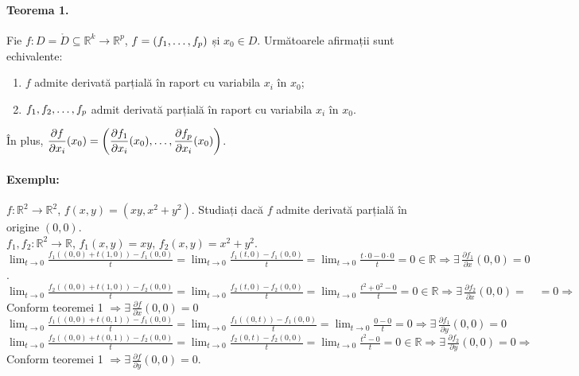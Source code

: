 \paragraph{Teorema 1.}
Fie $f:D = \mathring{D} \subseteq \mathbb{R}^{k} \rightarrow \mathbb{R}^{p}$, $f = (f_{1}, \mathellipsis, f_{p})$ și
$x_{0} \in D$. Următoarele afirmații sunt echivalente:
\begin{enumerate}[label=\emph{\alph*})]
    \item $f$ admite derivată parțială în raport cu variabila $x_{i}$ în $x_{0}$;
    \item $f_{1}, f_{2}, \mathellipsis, f_{p}$ admit derivată parțială în raport cu variabila $x_{i}$ în $x_{0}$.
\end{enumerate}
În plus, $\displaystyle\frac{\partial f}{\partial x_{i}}(x_{0}) = 
\left( \displaystyle\frac{\partial f_{1}}{\partial x_{i}}(x_{0}), \mathellipsis, \displaystyle\frac{\partial f_{p}}{\partial x_{i}}(x_{0}) \right)$.

\paragraph{Exemplu:}
$f:\mathbb{R}^{2} \rightarrow \mathbb{R}^{2}$, $f(x, y) = (xy, x^{2}+y^{2})$. Studiați dacă $f$ admite derivată parțială în origine $(0,0)$. \\[9pt]
$f_{1}, f_{2}: \mathbb{R}^{2} \rightarrow \mathbb{R}$, $f_{1}(x,y) = xy$, $f_{2}(x, y) = x^{2} + y^{2}$. \\[9pt]
$\displaystyle\lim_{t \rightarrow 0} \displaystyle\frac{f_{1}((0,0) + t(1,0)) - f_{1}(0,0)}{t} =
\displaystyle\lim_{t \rightarrow 0} \displaystyle\frac{f_{1}(t,0) - f_{1}(0,0)}{t} = 
\displaystyle\lim_{t \rightarrow 0} \displaystyle\frac{t \cdot 0 - 0 \cdot 0}{t} = 0 \in \mathbb{R}
\Rightarrow \exists \, \displaystyle\frac{\partial f_{1}}{\partial x}(0,0) = 0$. \\[7pt]
$\displaystyle\lim_{t \rightarrow 0} \displaystyle\frac{f_{2}((0,0) + t(1,0)) - f_{2}(0,0)}{t} =
\displaystyle\lim_{t \rightarrow 0} \displaystyle\frac{f_{2}(t,0) - f_{2}(0,0)}{t} = 
\displaystyle\lim_{t \rightarrow 0} \displaystyle\frac{t^{2} + 0^{2} - 0}{t} = 0 \in \mathbb{R}
\Rightarrow \exists \, \displaystyle\frac{\partial f_{2}}{\partial x}(0,0) = \quad =0 \Rightarrow$
Conform teoremei 1 $\Rightarrow \exists \, \displaystyle\frac{\partial f}{\partial x}(0,0) = 0$ \\[14pt]
$\displaystyle\lim_{t \rightarrow 0} \displaystyle\frac{f_{1}((0,0) + t(0,1)) - f_{1}(0,0)}{t} =
\displaystyle\lim_{t \rightarrow 0} \displaystyle\frac{f_{1}((0,t)) - f_{1}(0,0)}{t} =
\displaystyle\lim_{t \rightarrow 0} \displaystyle\frac{0 - 0}{t} = 0
\Rightarrow \exists \, \displaystyle\frac{\partial f_{1}}{\partial y}(0,0) = 0$ \\[7pt]
$\displaystyle\lim_{t \rightarrow 0} \displaystyle\frac{f_{2}((0,0) + t(0,1)) - f_{2}(0,0)}{t} =
\displaystyle\lim_{t \rightarrow 0} \displaystyle\frac{f_{2}(0,t) - f_{2}(0,0)}{t} = 
\displaystyle\lim_{t \rightarrow 0} \displaystyle\frac{t^{2} - 0}{t} = 0 \in \mathbb{R}
\Rightarrow \exists \, \displaystyle\frac{\partial f_{2}}{\partial y}(0,0) = 0 \Rightarrow$
Conform teoremei 1 $\Rightarrow \exists \, \displaystyle\frac{\partial f}{\partial y}(0,0) = 0$.


